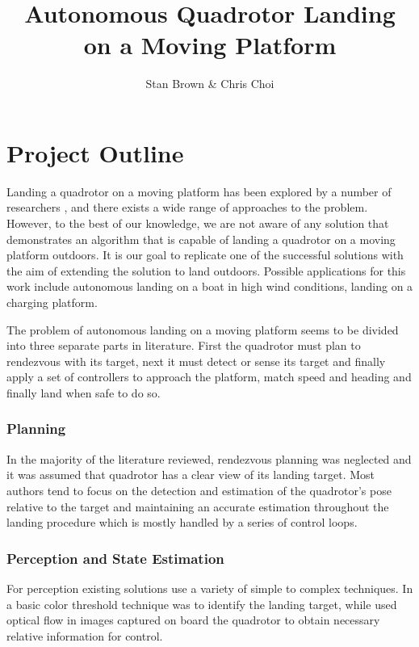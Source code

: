 \documentclass{article}[12pt]
\begin{document}
\title{Autonomous Quadrotor Landing on a Moving Platform}
\author{Stan Brown \& Chris Choi}
\date{}
\maketitle




\section*{Project Outline}
Landing a quadrotor on a moving platform has been explored by a number of researchers \cite{Lee2012, Kim2014, Voos2010, Friis2009, Ling2014, Herisse2012}, and there exists a wide range of approaches to the problem. However, to the best of our knowledge, we are not aware of any solution that demonstrates an algorithm that is capable of landing a quadrotor on a moving platform outdoors. It is our goal to replicate one of the successful solutions with the aim of extending the solution to land outdoors. Possible applications for this work include autonomous landing on a boat in high wind conditions, landing on a charging platform.

The problem of autonomous landing on a moving platform seems to be divided into three separate parts in literature. First the quadrotor must plan to rendezvous with its target, next it must detect or sense its target and finally apply a set of controllers to approach the platform, match speed and heading and finally land when safe to do so. 

\subsubsection*{Planning}
In the majority of the literature reviewed, rendezvous planning was neglected and it was assumed that quadrotor has a clear view of its landing target. Most authors tend to focus on the detection and estimation of the quadrotor's pose relative to the target and maintaining an accurate estimation throughout the landing procedure which is mostly handled by a series of control loops.

\subsubsection*{Perception and State Estimation}
For perception existing solutions use a variety of simple to complex techniques. In  \cite{Kim2014} a basic color threshold technique was to identify the landing target, while \cite{Herisse2012} used optical flow in images captured on board the quadrotor to obtain necessary relative information for control. 
\end{document}
